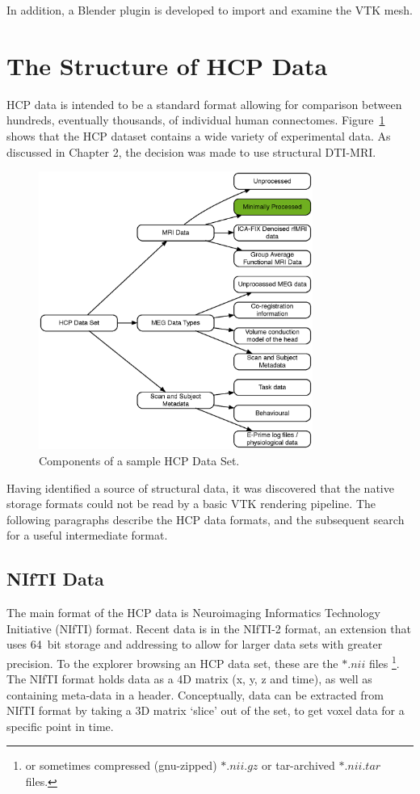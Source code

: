 \documentclass[MSc,paper=a4,pagesize=auto]{icldt}
\begin{document}
In addition, a Blender plugin is developed to import and examine the VTK mesh.

\clearpage
\section{The Structure of HCP Data} \label{sec:the_structure_of_hcp_data}
HCP data is intended to be a standard format allowing for comparison between hundreds, eventually thousands, of individual human connectomes. Figure~\ref{fig:hcp_full_data_set} shows that the HCP dataset contains a wide variety of experimental data. As discussed in Chapter 2, the decision was made to use structural DTI-MRI.

\begin{figure}[htbp!]
    \centering
    \includegraphics[width=0.8\textwidth]{resources/hcp_full_data_set}
    \caption{Components of a sample HCP Data Set.}
    \label{fig:hcp_full_data_set}
\end{figure}

Having identified a source of structural data, it was discovered that the native storage formats could not be read by a basic VTK rendering pipeline. The following paragraphs describe the HCP data formats, and the subsequent search for a useful intermediate format.

\clearpage
\subsection{NIfTI Data}
The main format of the HCP data is Neuroimaging Informatics Technology Initiative (NIfTI) format. Recent data is in the NIfTI-2 format, an extension that uses \SI{64}{bit} storage and addressing to allow for larger data sets with greater precision. To the explorer browsing an HCP data set, these are the $\ast.nii$ files \footnote{or sometimes compressed (gnu-zipped) $\ast.nii.gz$ or tar-archived $\ast.nii.tar$ files.}. The NIfTI format holds data as a 4D matrix (x, y, z and time), as well as containing meta-data in a header. Conceptually, data can be extracted from NIfTI format by taking a 3D matrix `slice' out of the set, to get voxel data for a specific point in time. 
\end{document}
